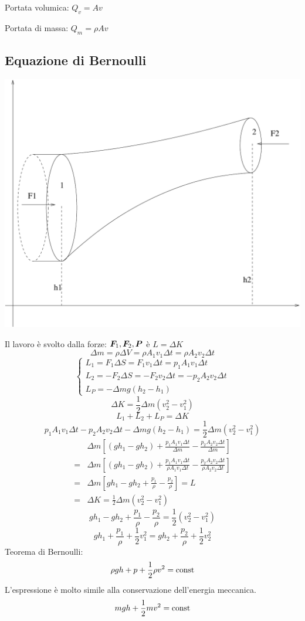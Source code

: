 Portata volumica: $Q_v=Av$

Portata di massa: $Q_m=\rho Av$

\subsection{Equazione di Bernoulli}


\begin{center}
\includegraphics[scale=0.4]{immagini/fisica1/Bernoulli}
\end{center}


Il lavoro è svolto dalla forze: $\boldsymbol{F}_1, \boldsymbol{F}_2, \boldsymbol{P}$ è $L=\Delta K$
$$\Delta m=\rho \Delta V=\rho A_1 v_1\Delta t=\rho A_2 v_2 \Delta t$$
$$
\left\{
        \begin{array}{lll}
        L_1=F_1\Delta S=F_1v_1\Delta t=p_1A_1v_1\Delta t\\
        L_2=-F_2\Delta S=-F_2v_2\Delta t=-p_2A_2v_2\Delta t\\
        L_P=-\Delta mg(h_2-h_1)
        \end{array}
\right.
$$
$$\Delta K=\frac{1}{2}\Delta m(v_2^2-v_1^2)$$
$$L_1+L_2+L_P=\Delta K$$
$$p_1A_1v_1\Delta t-p_2A_2v_2\Delta t-\Delta mg(h_2-h_1)=\frac{1}{2}\Delta m(v_2^2-v_1^2)$$
\begin{align*}
&\Delta m\left[\left(gh_1-gh_2\right)+\frac{p_1A_1v_1\Delta t}{\Delta m}-\frac{p_2A_2v_2\Delta t}{\Delta m}\right]\\
=&\Delta m\left[\left(gh_1-gh_2\right)+\frac{p_1A_1v_1\Delta t}{\rho A_1v_1\Delta t}-\frac{p_2A_2v_2\Delta t}{\rho A_2v_2\Delta t}\right]\\
=&\Delta m\left[gh_1-gh_2+\frac{p_1}{\rho}-\frac{p_2}{\rho}\right]=L\\
=&\Delta K=\frac{1}{2}\Delta m(v_2^2-v_1^2)
\end{align*}
$$gh_1-gh_2+\frac{p_1}{\rho}-\frac{p_2}{\rho}=\frac{1}{2}(v_2^2-v_1^2)$$
$$gh_1+\frac{p_1}{\rho}+\frac{1}{2}v_1^2=gh_2+\frac{p_2}{\rho}+\frac{1}{2}v_2^2$$
Teorema di Bernoulli:
$$\rho gh+p+\frac{1}{2}\rho v^2=\text{const}$$
L'espressione è molto simile alla conservazione dell'energia meccanica.
$$mgh+\frac{1}{2}mv^2=\text{const}$$

